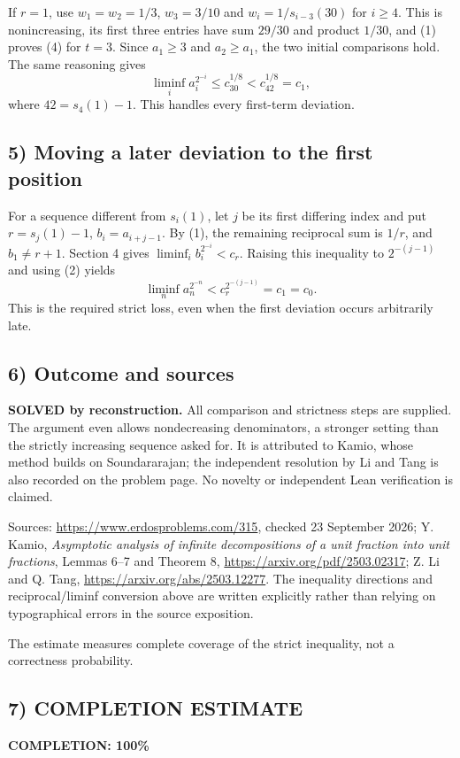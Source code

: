 If $r=1$, use $w_1=w_2=1/3$, $w_3=3/10$ and $w_i=1/s_{i-3}(30)$ for $i\ge4$. This is nonincreasing, its first three entries have sum $29/30$ and product $1/30$, and (1) proves (4) for $t=3$. Since $a_1\ge3$ and $a_2\ge a_1$, the two initial comparisons hold. The same reasoning gives
\[
 \liminf_i a_i^{2^{-i}}\le c_{30}^{1/8}<c_{42}^{1/8}=c_1,
\]
where $42=s_4(1)-1$. This handles every first-term deviation.

\subsection*{5) Moving a later deviation to the first position}
For a sequence different from $s_i(1)$, let $j$ be its first differing index and put $r=s_j(1)-1$, $b_i=a_{i+j-1}$. By (1), the remaining reciprocal sum is $1/r$, and $b_1\ne r+1$. Section 4 gives $\liminf_i b_i^{2^{-i}}<c_r$. Raising this inequality to $2^{-(j-1)}$ and using (2) yields
\[
 \liminf_n a_n^{2^{-n}}
 <c_r^{2^{-(j-1)}}=c_1=c_0.
\]
This is the required strict loss, even when the first deviation occurs arbitrarily late.

\subsection*{6) Outcome and sources}
\textbf{SOLVED by reconstruction.} All comparison and strictness steps are supplied. The argument even allows nondecreasing denominators, a stronger setting than the strictly increasing sequence asked for. It is attributed to Kamio, whose method builds on Soundararajan; the independent resolution by Li and Tang is also recorded on the problem page. No novelty or independent Lean verification is claimed.

Sources: \url{https://www.erdosproblems.com/315}, checked 23 September 2026; Y. Kamio, \emph{Asymptotic analysis of infinite decompositions of a unit fraction into unit fractions}, Lemmas 6--7 and Theorem 8, \url{https://arxiv.org/pdf/2503.02317}; Z. Li and Q. Tang, \url{https://arxiv.org/abs/2503.12277}. The inequality directions and reciprocal/liminf conversion above are written explicitly rather than relying on typographical errors in the source exposition.

The estimate measures complete coverage of the strict inequality, not a correctness probability.
\subsection*{7) COMPLETION ESTIMATE}
\textbf{COMPLETION: 100\%}
